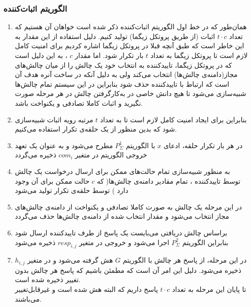 \subsubsection{الگوریتم اثبات‌کننده}\label{algorithm_prover}
\begin{enumerate}
	\item {
همان‌طور که در خط اول الگوریتم اثبات‌کننده ذکر شده است خواهان آن هستیم که تعداد
$ t\cdot c $
اثبات (از طریق پروتکل زیگما) تولید کنیم. دلیل استفاده از این مقدار به این خاطر است که طبق آنچه قبلا در پروتکل زیگما اشاره کردیم برای امنیت کامل لازم است تا پروتکل زیگما به تعداد
$t$
بار تکرار شود.
 اما مقدار 
$c$
، به این دلیل است که در پروتکل زیگما، تاییدکننده به انتخاب خود یک چالش را از میان چالش‌های مجاز(دامنه‌ی چالش‌ها)	انتخاب می‌کند ولی به دلیل آنکه در ساخت آنره هدف آن است که ارتباط با تاییدکننده حذف شود بنابراین در این سیستم تمام چالش‌ها  شبیه‌سازی می‌شود تا هیچ دانش خاصی در به‌کارگرفتن چالش در هر مرحله صورت نگیرید و اثبات کاملا تصادفی و یکنواخت باشد.
}

\item {
بنابراین برای ایجاد امنیت کامل لازم است تا به تعداد  
$t$
مرتبه رویه اثبات شبیه‌سازی شود که بدین منظور از یک حلقه‌ی تکرار استفاده می‌کنیم. 
}

\item {
در هر بار تکرار حلقه، ادعای 
$x$
 با الگوریتم 
$P^1_{\Sigma}$
 مطرح می‌شود و به عنوان یک تعهد خروجی الگوریتم در متغیر
$com_i$
ذخیره می‌گردد
}

\item {
به منظور شبیه‌سازی تمام حالت‌های ممکن برای ارسال درخواست یک چالش توسط تاییدکننده ، تمام مقادیر دامنه‌ی چالش‌ها( که 
$c$
حالت ممکن برای آن وجود دارد
)  توسط حلقه‌ی تکرار تولید می‌شود
}

\item {
در این مرحله یک چالش به صورت کاملا تصادفی و یکنواخت از دامنه‌ی چالش‌های مجاز انتخاب می‌شود و مقدار انتخاب شده از دامنه‌ی چالش‌ها حذف می‌گردد
}

\item {
براساس چالش دریافتی می‌بایست یک پاسخ از طرف تاییدکننده ارسال شود بنابراین الگوریتم
$P^2_{\Sigma}$
اجرا می‌شود و خروجی در متغیر
$resp_{i,j}$
ذخیره می‌شود
}

\item {
در این مرحله، از پاسخ هر چالش با الگوریتم
$G$
هش گرفته می‌شود و در متغیر 
$h_{i,j}$
ذخیره می‌شود. دلیل این امر آن است که مطمئن باشیم که پاسخ هر چالش بدون تغییر ذخیره شده است.
}\\
 تا پایان این مرحله به تعداد
$t \cdot c $
پاسخ داریم که البته هش شده است و غیرقابل‌تغییر می‌باشند.


\end{enumerate}
